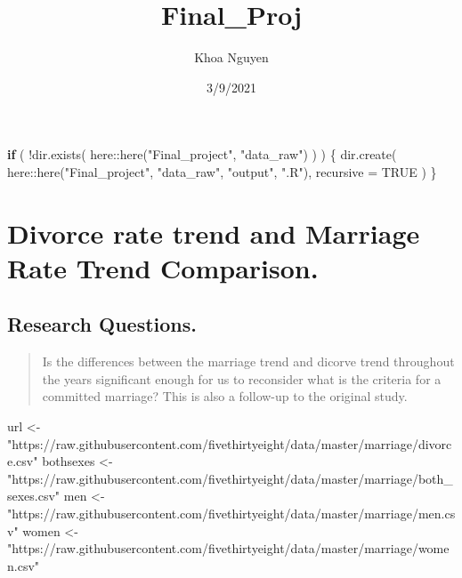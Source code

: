 \documentclass[
]{article}
\title{Final\_Proj}
\author{Khoa Nguyen}
\date{3/9/2021}
\newenvironment{Shaded}{\begin{snugshade}}{\end{snugshade}}
\newcommand{\AttributeTok}[1]{\textcolor[rgb]{0.77,0.63,0.00}{#1}}
\newcommand{\ConstantTok}[1]{\textcolor[rgb]{0.00,0.00,0.00}{#1}}
\newcommand{\ControlFlowTok}[1]{\textcolor[rgb]{0.13,0.29,0.53}{\textbf{#1}}}
\newcommand{\FunctionTok}[1]{\textcolor[rgb]{0.00,0.00,0.00}{#1}}
\newcommand{\NormalTok}[1]{#1}
\newcommand{\OtherTok}[1]{\textcolor[rgb]{0.56,0.35,0.01}{#1}}
\newcommand{\SpecialCharTok}[1]{\textcolor[rgb]{0.00,0.00,0.00}{#1}}
\newcommand{\StringTok}[1]{\textcolor[rgb]{0.31,0.60,0.02}{#1}}
\begin{document}
\maketitle

\begin{Shaded}
\begin{Highlighting}[]
\ControlFlowTok{if}\NormalTok{ ( }\SpecialCharTok{!}\FunctionTok{dir.exists}\NormalTok{( here}\SpecialCharTok{::}\FunctionTok{here}\NormalTok{(}\StringTok{"Final\_project"}\NormalTok{, }\StringTok{"data\_raw"}\NormalTok{) ) ) \{}
  \FunctionTok{dir.create}\NormalTok{( here}\SpecialCharTok{::}\FunctionTok{here}\NormalTok{(}\StringTok{"Final\_project"}\NormalTok{, }\StringTok{"data\_raw"}\NormalTok{, }\StringTok{"output"}\NormalTok{, }\StringTok{".R"}\NormalTok{), }\AttributeTok{recursive =} \ConstantTok{TRUE}\NormalTok{ )}
\NormalTok{\}}
\end{Highlighting}
\end{Shaded}

\hypertarget{divorce-rate-trend-and-marriage-rate-trend-comparison.}{%
\section{Divorce rate trend and Marriage Rate Trend
Comparison.}\label{divorce-rate-trend-and-marriage-rate-trend-comparison.}}

\hypertarget{research-questions.}{%
\subsection{Research Questions.}\label{research-questions.}}

\begin{quote}
Is the differences between the marriage trend and dicorve trend
throughout the years significant enough for us to reconsider what is the
criteria for a committed marriage? This is also a follow-up to the
original study.
\end{quote}

\begin{Shaded}
\begin{Highlighting}[]
\NormalTok{url }\OtherTok{\textless{}{-}} \StringTok{"https://raw.githubusercontent.com/fivethirtyeight/data/master/marriage/divorce.csv"}
\NormalTok{bothsexes }\OtherTok{\textless{}{-}} \StringTok{"https://raw.githubusercontent.com/fivethirtyeight/data/master/marriage/both\_sexes.csv"}
\NormalTok{men }\OtherTok{\textless{}{-}} \StringTok{"https://raw.githubusercontent.com/fivethirtyeight/data/master/marriage/men.csv"}
\NormalTok{women }\OtherTok{\textless{}{-}}  \StringTok{"https://raw.githubusercontent.com/fivethirtyeight/data/master/marriage/women.csv"}
\end{Highlighting}
\end{Shaded}
\end{document}
